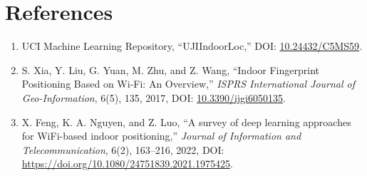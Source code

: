 \documentclass[
  10pt,
  a4paper,
]{article}
\providecommand{\tightlist}{%
  \setlength{\itemsep}{0pt}\setlength{\parskip}{0pt}}
\begin{document}
\section{References}\label{references}

\begin{enumerate}
\def\labelenumi{\arabic{enumi}.}
\tightlist
\item
  UCI Machine Learning Repository, ``UJIIndoorLoc,'' DOI:
  \href{https://doi.org/10.24432/C5MS59}{10.24432/C5MS59}.
\item
  S. Xia, Y. Liu, G. Yuan, M. Zhu, and Z. Wang, ``Indoor Fingerprint
  Positioning Based on Wi-Fi: An Overview,'' \emph{ISPRS International
  Journal of Geo-Information}, 6(5), 135, 2017, DOI:
  \href{https://doi.org/10.3390/ijgi6050135}{10.3390/ijgi6050135}.
\item
  X. Feng, K. A. Nguyen, and Z. Luo, ``A survey of deep learning
  approaches for WiFi-based indoor positioning,'' \emph{Journal of
  Information and Telecommunication}, 6(2), 163--216, 2022, DOI:
  \url{https://doi.org/10.1080/24751839.2021.1975425}.
\end{enumerate}
\end{document}
